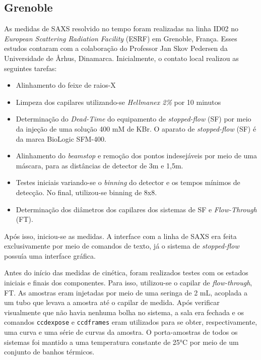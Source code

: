 			\subsection{Grenoble}
			As medidas de SAXS resolvido no tempo foram realizadas na linha ID02 no \emph{European Scattering Radiation Facility} (ESRF) em Grenoble, França. Esses estudos contaram com a colaboração do Professor Jan Skov Pedersen da Universidade de \AA rhus, Dinamarca. Inicialmente, o contato local realizou as seguintes tarefas:
			
			\begin{itemize}
				\item Alinhamento do feixe de raios-X
				\item Limpeza dos capilares utilizando-se \emph{Hellmanex 2\%} por 10 minutos
				\item Determinação do \emph{Dead-Time} do equipamento de \emph{stopped-flow} (SF) por meio da injeção de uma solução 400 mM de KBr. O aparato de \emph{stopped-flow} (SF) é da marca BioLogic SFM-400.
				\item Alinhamento do \emph{beamstop} e remoção dos pontos indesejáveis por meio de uma máscara, para as distâncias de detector de 3m e 1,5m.
				\item Testes iniciais variando-se o \emph{binning} do detector e os tempos mínimos de detecção. No final, utilizou-se binning de 8x8.
				\item Determinação dos diâmetros dos capilares dos sistemas de SF e \emph{Flow-Through} (FT).
			\end{itemize}
			
			Após isso, iniciou-se as medidas. A interface com a linha de SAXS era feita exclusivamente por meio de comandos de texto, já o sistema de \emph{stopped-flow} possuía uma interface gráfica.
			
			Antes do início das medidas de cinética, foram realizados testes com os estados iniciais e finais dos componentes. Para isso, utilizou-se o capilar de \emph{flow-through}, FT. As amostras eram injetadas por meio de uma seringa de 2 mL, acoplada a um tubo que levava a amostra até o capilar de medida. Após verificar visualmente que não havia nenhuma bolha no sistema, a sala era fechada e os comandos \texttt{ccdexpose} e \texttt{ccdframes} eram utilizados para se obter, respectivamente, uma curva e uma série de curvas da amostra. O porta-amostras de todos os sistemas foi mantido a uma temperatura constante de 25°C por meio de um conjunto de banhos térmicos.
			
